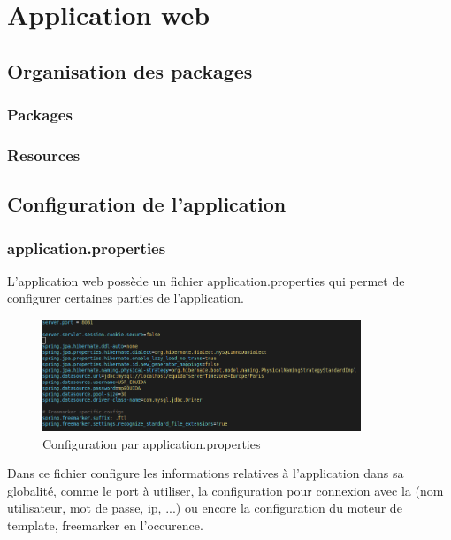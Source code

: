 \chapter{Application web}

	\section{Organisation des packages}

		\subsection{Packages}


		\subsection{Resources}


	\section{Configuration de l'application}

		\subsection{application.properties}

			L'application web possède un fichier application.properties qui permet de configurer certaines parties de l'application.

			\begin{figure}[H]
				\centering\includegraphics[width=0.85\textwidth, keepaspectratio]{res/application-properties.png}
				\caption{Configuration par application.properties}
			\end{figure}

			Dans ce fichier configure les informations relatives à l'application dans sa globalité, comme le port à utiliser, la configuration pour connexion avec la \bdd{} (nom utilisateur, mot de passe, ip, ...) ou encore la configuration du moteur de template, freemarker en l'occurence.

